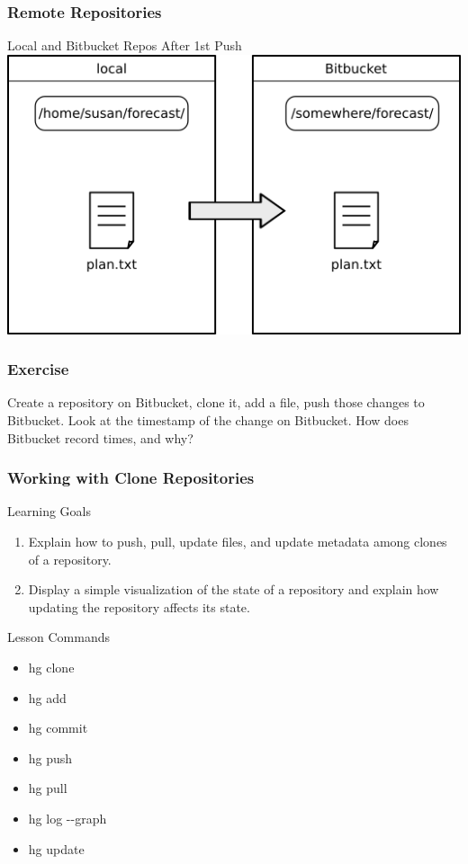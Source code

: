 \documentclass{beamer}
\renewcommand{\dh}{{-}{-}}
\begin{document}
\begin{frame}
  \frametitle{Remote Repositories}
  \begin{block}{Local and Bitbucket Repos After 1st Push}
    \includegraphics[scale=0.55]{../fig/bitbucket-repo-after-first-push.png}
  \end{block}
\end{frame}




\begin{frame}
\frametitle{Exercise}
Create a repository on Bitbucket, clone it, add a file, push those changes to Bitbucket.
Look at the timestamp of the change on Bitbucket.
How does Bitbucket record times, and why?
\end{frame}


\begin{frame}[label=clones]
  \frametitle{Working with Clone Repositories}
  \begin{block}{Learning Goals}
    \begin{enumerate}
      \item Explain how to push, pull, update files, and update metadata among clones of a repository.
      \item Display a simple visualization of the state of a repository and explain how updating the repository affects its state.
    \end{enumerate}
  \end{block}
  \begin{block}{Lesson Commands}
    \begin{itemize}
      \item hg clone
      \item hg add
      \item hg commit
      \item hg push
      \item hg pull
      \item hg log \dh graph
      \item hg update
    \end{itemize}
  \end{block}
\end{frame}
\end{document}
